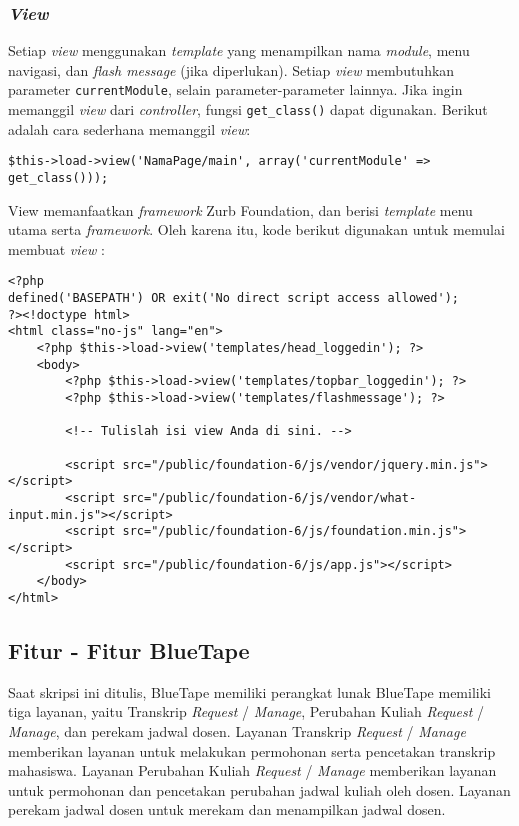 \subsubsection{\textit{View}}
	Setiap \textit{view} menggunakan \textit{template} yang menampilkan nama \textit{module}, menu navigasi, dan \textit{flash message} (jika diperlukan). Setiap \textit{view} membutuhkan parameter \texttt{currentModule}, selain parameter-parameter lainnya. Jika ingin memanggil \textit{view} dari \textit{controller}, fungsi \texttt{get\_class()} dapat digunakan. Berikut adalah cara sederhana memanggil \textit{view}:  
\begin{lstlisting}
$this->load->view('NamaPage/main', array('currentModule' => get_class()));
\end{lstlisting}

	View memanfaatkan \textit{framework} Zurb Foundation, dan berisi \textit{template} menu utama serta \textit{framework}. Oleh karena itu, kode berikut digunakan untuk memulai membuat \textit{view} :
\begin{lstlisting}
<?php
defined('BASEPATH') OR exit('No direct script access allowed');
?><!doctype html>
<html class="no-js" lang="en">
    <?php $this->load->view('templates/head_loggedin'); ?>
    <body>
        <?php $this->load->view('templates/topbar_loggedin'); ?>
        <?php $this->load->view('templates/flashmessage'); ?>

        <!-- Tulislah isi view Anda di sini. -->

        <script src="/public/foundation-6/js/vendor/jquery.min.js"></script>
        <script src="/public/foundation-6/js/vendor/what-input.min.js"></script>
        <script src="/public/foundation-6/js/foundation.min.js"></script>
        <script src="/public/foundation-6/js/app.js"></script>
    </body>
</html>
\end{lstlisting}

\subsection{Fitur - Fitur BlueTape}
	Saat skripsi ini ditulis, BlueTape memiliki perangkat lunak BlueTape memiliki tiga layanan, yaitu Transkrip \textit{Request} / \textit{Manage}, Perubahan Kuliah \textit{Request} / \textit{Manage}, dan perekam jadwal dosen. Layanan Transkrip \textit{Request} / \textit{Manage} memberikan layanan untuk melakukan permohonan serta pencetakan transkrip mahasiswa. Layanan Perubahan Kuliah \textit{Request} / \textit{Manage} memberikan layanan untuk permohonan dan pencetakan perubahan jadwal kuliah oleh dosen. Layanan perekam jadwal dosen untuk merekam dan menampilkan jadwal dosen.

